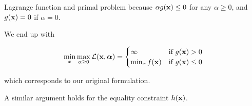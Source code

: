 \documentclass[11pt,compress,t,notes=noshow, xcolor=table]{beamer}
\begin{document}
\begin{vbframe}{Lagrange function and primal problem}
because $\alpha g(\mathbf{x}) \le 0$ for any $\alpha \ge 0$, and $g(\mathbf{x}) = 0$ if $\alpha = 0$. 

\framebreak 

We end up with 

\begin{eqnarray*}
	\min_x\max_{\alpha \ge 0} \mathcal{L}(\mathbf{x}, \bm{\alpha}) = \begin{cases} \infty & \text{if } g(\mathbf{x}) > 0 \\ \min_x f(\mathbf{x}) & \text{if }  g(\mathbf{x}) \le 0\end{cases}
\end{eqnarray*}

which corresponds to our original formulation. 

\vspace*{0.2cm} 

A similar argument holds for the equality constraint $h(\mathbf{x})$.

\end{vbframe}
\end{document}
